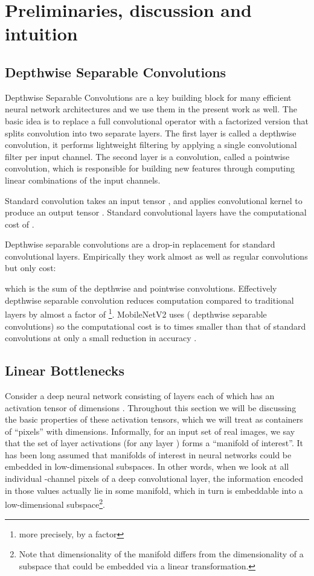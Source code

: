 \documentclass[10pt,twocolumn,letterpaper]{article}
\begin{document}
\section{Preliminaries, discussion and intuition}

\subsection{Depthwise Separable Convolutions}
Depthwise Separable Convolutions are a key building block for many efficient neural network architectures \cite{MobilenetV1,Chollet_2017_CVPR,ShuffleNet2017} and we use them in the present work as well.
The basic idea is to replace a full convolutional operator with a factorized version that splits convolution into two separate layers.
The first layer is called a depthwise convolution, it performs lightweight filtering by applying a single convolutional filter per input channel.
The second layer is a  convolution, called a pointwise convolution, which is responsible for building new features through computing linear combinations of the input channels. 

Standard convolution takes an  input tensor , and applies convolutional  kernel  to produce an  output tensor .
Standard convolutional layers have the computational cost of . 

Depthwise separable convolutions are a drop-in replacement for standard convolutional layers.
Empirically they work almost as well as regular convolutions but only cost:

which is the sum of the depthwise and  pointwise convolutions.
Effectively depthwise separable convolution reduces computation compared to traditional layers by almost a factor of \footnote{more precisely, by a factor }.
\mbox{MobileNetV2} uses  ( depthwise separable convolutions) so the computational cost is  to  times smaller than that of standard convolutions at only a small reduction in accuracy \cite{MobilenetV1}.

\subsection{Linear Bottlenecks}
\label{sec:bottlenecks}
Consider a deep neural network consisting of  layers  each of which has an activation tensor of dimensions .
Throughout this section we will be discussing the basic properties of these
activation tensors, which we will treat as containers of  ``pixels'' with  dimensions.
Informally, for an input set of real images, we say that the set of layer activations (for any layer ) forms a ``manifold of interest''. It has been long assumed that manifolds of interest in neural networks could be embedded in low-dimensional subspaces.
In other words, when we look at all individual -channel pixels of a deep 
convolutional layer, the information encoded in those values actually lie in some manifold, which in turn is embeddable into a low-dimensional subspace\footnote{Note that dimensionality of the manifold differs from the dimensionality of a subspace that could be embedded via a linear transformation.}.
\end{document}
